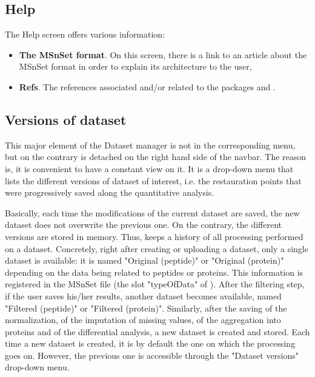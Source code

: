 \documentclass[12pt]{article}
\begin{document}
{%
\subsection{Help}
The Help screen offers various information:
\begin{itemize}
\item\textbf{{The MSnSet format}}. On this screen, there is a link to an 
article about the MSnSet format in order to explain its architecture to the 
user,
\item\textbf{{Refs}}. The references associated and/or related to the 
packages  and .
\end{itemize}


\subsection{Versions of dataset}\label{sec:availabledatasets}
This major element of the Dataset manager is not in the corresponding menu, 
but on the contrary is detached on the right hand side of the navbar. The 
reason is,  it is convenient to have a constant view on it. It is a drop-down 
menu that lists the different versions of dataset of interest, i.e. the 
restauration points that were progressively saved along the quantitative 
analysis. 

Basically, each time the modifications of the current dataset are saved, the 
new dataset does not overwrite the previous one. On the contrary, the 
different versions are stored in memory. Thus,  keeps a 
history of all processing performed on a dataset. Concretely, right after 
creating or uploading a dataset, only a single dataset is available: it is 
named "Original (peptide)" or "Original (protein)" depending on the data 
being related to peptides or proteins. This information is registered in the 
MSnSet file (the slot "typeOfData" of ). 
After the filtering step, if the user saves his/her results, another dataset 
becomes available, named "Filtered (peptide)" or "Filtered (protein)". 
Similarly, after the saving of the normalization, of the imputation of 
missing values, of the aggregation into proteins and of the differential 
analysis, a new dataset is created and stored. Each time a new dataset is 
created, it is by default the one on which the processing goes on. However, 
the previous one is accessible through the "Dataset versions" drop-down menu.

}
\end{document}
